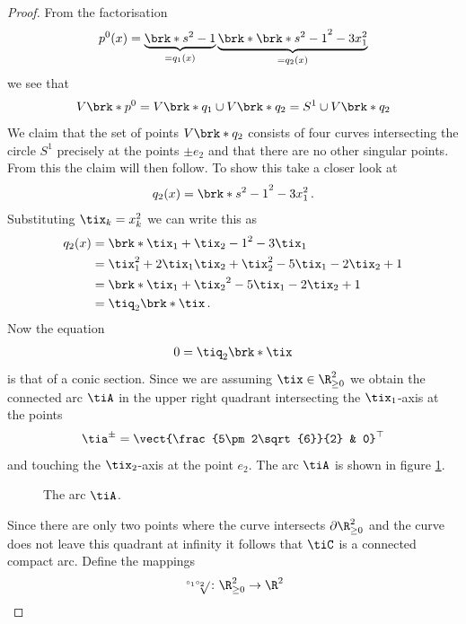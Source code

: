 \begin{proof}
  From the factorisation
  \begin{align*}
    p^0(x)=\underbrace{\brk*{s^2-1}}_{=q_1(x)}\underbrace{\brk*{\brk*{s^2-1}^2-3x_1^2}}_{=q_2(x)}
  \end{align*}
  we see that
  \begin{align*}
    V\brk*{p^0}=V\brk*{q_1}\cup V\brk*{q_2}=S^1\cup V\brk*{q_2}
  \end{align*}
  We claim that the set of points $V\brk*{q_2}$ consists of four curves intersecting the
  circle $S^1$ precisely at the points $\pm e_2$ and that there are no other singular points.
  From this the claim will then follow.
  To show this take a closer look at
  \begin{align*}
    q_2(x)=\brk*{s^2-1}^2-3x_1^2\,.
  \end{align*}
  Substituting $\tix_k=x_k^2$ we can write this as
  \begin{align*}
    q_2(x)&=\brk*{\tix_1+\tix_2-1}^2-3\tix_1\\
    &=\tix_1^2+2\tix_1\tix_2+\tix_2^2-5\tix_1-2\tix_2+1 \\
    &=\brk*{\tix_1+\tix_2}^2-5\tix_1-2\tix_2+1\\
    &=\tiq_2\brk*{\tix}\,.
  \end{align*}
  Now the equation 
  \begin{align*}
    0=\tiq_2\brk*{\tix}
  \end{align*}
  is that of a conic section. Since we are assuming $\tix\in\R_{\geq0}^2$
  we obtain the connected arc $\tiA$ in the upper right quadrant intersecting the $\tix_1$-axis at the points
  \begin{align*}
    \tia^\pm=\vect{\frac{5\pm2\sqrt{6}}{2} & 0}^\top
  \end{align*}
  and touching the $\tix_2$-axis at the point $e_2$.
  The arc $\tiA$ is shown in figure \ref{fi:n3_polynomial_conicArc}.
  \begin{figure}
    \centering
    
    \caption{The arc $\tiA$.}
    \label{fi:n3_polynomial_conicArc}
  \end{figure}
  Since there are only two points where the curve intersects $\partial\R_{\geq0}^2$
  and the curve does not leave this quadrant at infinity it follows that $\tiC$ is
  a connected compact arc.
  Define the mappings
  \begin{align}
    \sqrt[\leftroot{2}\uproot{4}\circ_1\circ_2]{}\colon \R_{\geq0}^2&\to\R^2 \\

\end{align}
\end{proof}
